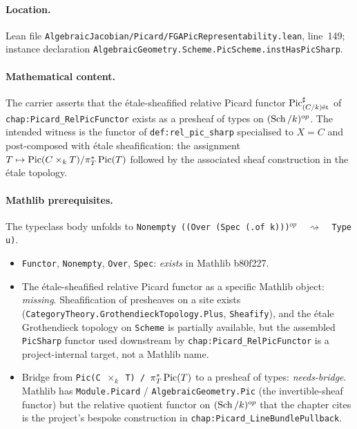 \paragraph{Location.} Lean file
\texttt{AlgebraicJacobian/Picard/FGAPicRepresentability.lean},
line~149; instance declaration
\texttt{AlgebraicGeometry.Scheme.PicScheme.instHasPicSharp}.

\paragraph{Mathematical content.} The carrier asserts that the
\'etale-sheafified relative Picard functor $\operatorname{Pic}^\sharp_{(C/k)\mathrm{\acute{e}t}}$ of
\texttt{chap:Picard_RelPicFunctor} exists as a presheaf of types on
$(\operatorname{Sch}/k)^{op}$. The intended witness is the functor of \texttt{def:rel_pic_sharp}
specialised to $X = C$ and post-composed with \'etale sheafification:
the assignment $T \mapsto \operatorname{Pic}(C \times_k T) / \pi_T^* \operatorname{Pic}(T)$
followed by the associated sheaf construction in the \'etale topology.

\paragraph{Mathlib prerequisites.} The typeclass body unfolds to
\texttt{Nonempty ((Over (Spec (.of k)))${}^{op}$ \,$\rightsquigarrow$\, Type u)}.
\begin{itemize}
  \item \texttt{Functor}, \texttt{Nonempty}, \texttt{Over},
    \texttt{Spec}: \emph{exists} in Mathlib b80f227.
  \item The \'etale-sheafified relative Picard functor as a specific
    Mathlib object: \emph{missing}. Sheafification of presheaves on a
    site exists (\texttt{CategoryTheory.GrothendieckTopology.Plus},
    \texttt{Sheafify}), and the \'etale Grothendieck topology on
    \texttt{Scheme} is partially available, but the assembled
    \texttt{PicSharp} functor used downstream by
    \texttt{chap:Picard_RelPicFunctor} is a project-internal target,
    not a Mathlib name.
  \item Bridge from \texttt{Pic(C ${}\times_k$ T) / $\pi_T^* \operatorname{Pic}(T)$}
    to a presheaf of types: \emph{needs-bridge}. Mathlib has
    \texttt{Module.Picard} / \texttt{AlgebraicGeometry.Pic} (the
    invertible-sheaf functor) but the relative quotient functor on
    $(\operatorname{Sch}/k)^{op}$ that the chapter cites is the project's bespoke
    construction in \texttt{chap:Picard_LineBundlePullback}.
\end{itemize}

